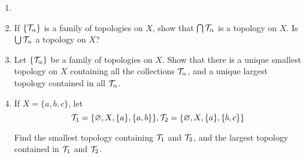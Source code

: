 \documentclass[a4paper, 12pt]{article}
\begin{document}
\begin{problem} 
\begin{enumerate}
\item []
\item If $\{\mathcal{T}_\alpha\}$ is a family of topologies on $X$, show that $\bigcap \mathcal{T}_\alpha$ is a topology on $X$. Is $\bigcup \mathcal{T}_\alpha$ a topology on $X$?
\item Let $\{\mathcal{T}_\alpha\}$ be a family of topologies on $X$. Show that there is a unique smallest topology on $X$ containing all the collections $\mathcal{T}_\alpha$, and a unique largest topology contained in all $\mathcal{T}_\alpha$.
\item If $X = \{a, b, c\}$, let \begin{equation*}
\mathcal{T}_1 = \{\varnothing, X, \{a\}, \{a, b\}\}, \mathcal{T}_2 = \{\varnothing, X, \{a\}, \{b, c\}\}    
\end{equation*}

Find the smallest topology containing $\mathcal{T}_1$ and $\mathcal{T}_2$, and the largest topology contained in $\mathcal{T}_1$ and $\mathcal{T}_2$.
\end{enumerate}
\end{problem}
\end{document}
